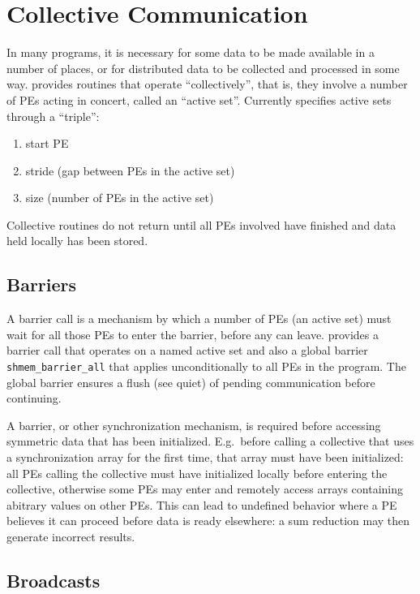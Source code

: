 \section{Collective Communication}

In many programs, it is necessary for some data to be made available
in a number of places, or for distributed data to be collected and
processed in some way. \openshmem provides routines that operate
``collectively'', that is, they involve a number of PEs acting in
concert, called an ``active set''.  Currently \openshmem specifies
active sets through a ``triple'':

\begin{enumerate}
\item start PE
\item stride (gap between PEs in the active set)
\item size (number of PEs in the active set)
\end{enumerate}

Collective routines do not return until all PEs involved have finished
and data held locally has been stored.

\subsection{Barriers}


A barrier call is a mechanism by which a number of PEs (an active set)
must wait for all those PEs to enter the barrier, before any can
leave.  \openshmem provides a barrier call that operates on a named
active set and also a global barrier \texttt{shmem\_barrier\_all} that
applies unconditionally to all PEs in the program.  The global barrier
ensures a flush (see quiet) of pending \openshmem communication before
continuing.

A barrier, or other synchronization mechanism, is required before
accessing symmetric data that has been initialized.  E.g.\ before
calling a collective that uses a synchronization array for the first
time, that array must have been initialized: all PEs calling the
collective must have initialized locally before entering the
collective, otherwise some PEs may enter and remotely access arrays
containing abitrary values on other PEs.  This can lead to undefined
behavior where a PE believes it can proceed before data is ready
elsewhere: a sum reduction may then generate incorrect results.

\subsection{Broadcasts}

